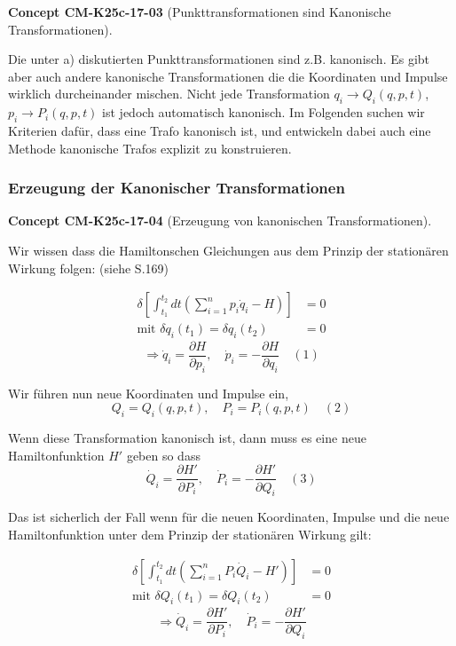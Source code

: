 \documentclass[10pt, letterpaper]{article}
\newcommand{\CustomHeading}[3]{%
  \par\medskip\noindent%
  \textbf{#1 #2} \textnormal{(#3)}.\enskip%
}
\newenvironment{CONC}[2]{\begin{unitbox}\CustomHeading{Concept}{#1}{#2}}{\end{unitbox}}
\begin{document}
\begin{CONC}{CM-K25c-17-03}{Punkttransformationen sind Kanonische Transformationen}
Die unter a) diskutierten Punkttransformationen sind z.B. kanonisch. Es gibt aber auch andere kanonische Transformationen die die Koordinaten und Impulse wirklich durcheinander mischen. Nicht jede Transformation $q_i \to Q_i(q,p,t)$, $p_i \to P_i(q,p,t)$ ist jedoch automatisch kanonisch. Im Folgenden suchen wir Kriterien dafür, dass eine Trafo kanonisch ist, und entwickeln dabei auch eine Methode kanonische Trafos explizit zu konstruieren.
\end{CONC}




\pagebreak



\subsubsection*{Erzeugung der Kanonischer Transformationen}

\begin{CONC}{CM-K25c-17-04}{Erzeugung von kanonischen Transformationen}
Wir wissen dass die Hamiltonschen Gleichungen aus dem Prinzip der stationären Wirkung folgen: (siehe S.169)

\begin{align*}
\delta \left[\int_{t_1}^{t_2} dt\left(\sum_{i=1}^n p_i\dot{q}_i - H\right)\right] &= 0\\
\text{mit } \delta q_i(t_1) = \delta q_i(t_2) &= 0
\end{align*}
\[\Rightarrow \dot{q}_i = \frac{\partial H}{\partial p_i}, \quad \dot{p}_i = -\frac{\partial H}{\partial q_i} \quad (1)\]

Wir führen nun neue Koordinaten und Impulse ein,
\[Q_i = Q_i(q,p,t), \quad P_i = P_i(q,p,t) \quad (2)\]

Wenn diese Transformation kanonisch ist, dann muss es eine neue Hamiltonfunktion $H'$ geben so dass
\[\dot{Q}_i = \frac{\partial H'}{\partial P_i}, \quad \dot{P}_i = -\frac{\partial H'}{\partial Q_i} \quad (3)\]

Das ist sicherlich der Fall wenn für die neuen Koordinaten, Impulse und die neue Hamiltonfunktion unter dem Prinzip der stationären Wirkung gilt:

\begin{align*}
\delta \left[\int_{t_1}^{t_2} dt\left(\sum_{i=1}^n P_i\dot{Q}_i - H'\right)\right] &= 0\\
\text{mit } \delta Q_i(t_1) = \delta Q_i(t_2) &= 0
\end{align*}
\[\Rightarrow \dot{Q}_i = \frac{\partial H'}{\partial P_i}, \quad \dot{P}_i = -\frac{\partial H'}{\partial Q_i}\]
\end{CONC}
\end{document}
